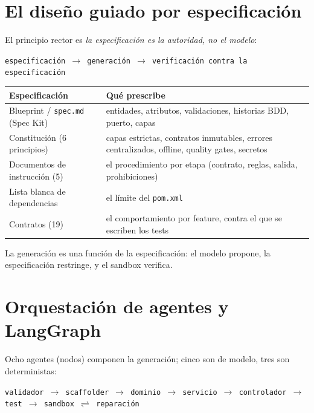 \documentclass[11pt,a4paper]{article}
\begin{document}
\section{El diseño guiado por especificación}

El principio rector es \emph{la especificación es la autoridad, no el modelo}:

\begin{center}
\texttt{especificación $\rightarrow$ generación $\rightarrow$ verificación contra la especificación}
\end{center}

\begin{center}
\begin{longtable}{@{}p{}p{}@{}}
\toprule
\textbf{Especificación} & \textbf{Qué prescribe} \\
\midrule
Blueprint / \texttt{spec.md} (Spec Kit) & entidades, atributos, validaciones, historias BDD, puerto, capas \\
Constitución (6 principios) & capas estrictas, contratos inmutables, errores centralizados, offline, quality gates, secretos \\
Documentos de instrucción (5) & el procedimiento por etapa (contrato, reglas, salida, prohibiciones) \\
Lista blanca de dependencias & el límite del \texttt{pom.xml} \\
Contratos (19) & el comportamiento por feature, contra el que se escriben los tests \\
\bottomrule
\end{longtable}
\end{center}

La generación es una función de la especificación: el modelo propone, la especificación
restringe, y el sandbox verifica.

\section{Orquestación de agentes y LangGraph}

Ocho agentes (nodos) componen la generación; cinco son de modelo, tres son
deterministas:

\begin{center}
\texttt{validador $\rightarrow$ scaffolder $\rightarrow$ dominio $\rightarrow$ servicio
$\rightarrow$ controlador $\rightarrow$ test $\rightarrow$ sandbox
$\rightleftharpoons$ reparación}
\end{center}
\end{document}
